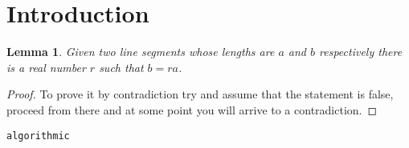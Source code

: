 \newtheorem{theorem}{Theorem}[section]
\newtheorem{lemma}[theorem]{Lemma}

\section{Introduction}
\begin{lemma}
Given two line segments whose lengths are \(a\) and \(b\) respectively there 
is a real number \(r\) such that \(b=ra\).
\end{lemma}

\begin{proof}
To prove it by contradiction try and assume that the statement is false,
proceed from there and at some point you will arrive to a contradiction.
\end{proof}

\verb|algorithmic|